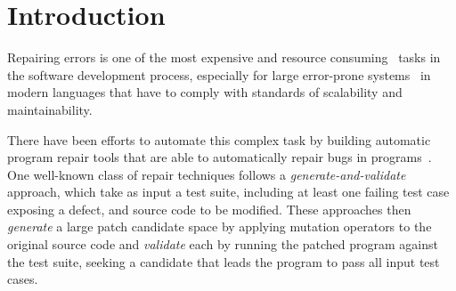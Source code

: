 \documentclass[conference]{IEEEtran}
\newcommand{\todo}[1]
  {{\scriptsize \textbf{\color{red} {#1}}}}
\begin{document}
\section{Introduction} \label{introduction}



Repairing errors is one of the most expensive\cite{Tassey02,Britton13} and 
resource consuming~\cite{Weiss07} tasks in 
the software development process, especially for large error-prone systems~\cite{Liblit03,Anvik05} in modern languages that have to comply with standards of scalability and 
maintainability.

There have been efforts to automate this complex task by 
building automatic program repair tools that are able to automatically repair 
bugs in 
programs~\cite{legoues12,kim2013,Weimer13,fan15,long15,debroy10,perkins09,wei10}. 
One well-known class of repair techniques follows a 
\emph{generate-and-validate} approach, which take as input a test suite, 
including at
least one failing test case exposing
a defect, and source code to be 
modified.  These approaches then \emph{generate} a large patch candidate space 
by applying 
mutation operators to the original source code and \emph{validate} each by
running the patched  program against the test suite, seeking a candidate that
leads the program to pass all input test cases. 
\end{document}
